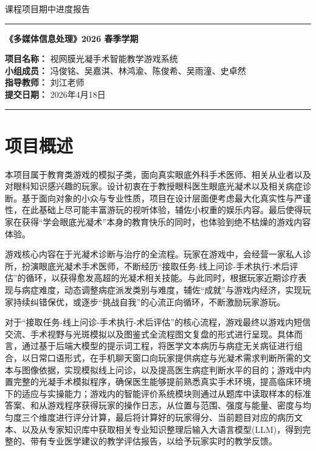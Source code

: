 \documentclass[12pt,a4paper]{ctexart}
\newcommand{\templaterule}{
  \noindent\color{linegray}\rule{\textwidth}{0.5pt}\color{black}
}
\begin{document}
{ 课程项目期中进度报告\par}

\vspace{1em}
\templaterule
\vspace{1.5em}

{\bfseries 《多媒体信息处理》2026 春季学期\par}
\vspace{1em}

\begin{tcolorbox}[
  enhanced,
  breakable,
  colback=white,
  colframe=white,
  boxrule=0pt,
  left=1em,
  right=0pt,
  top=0.5em,
  bottom=0.5em,
  borderline west={1.2pt}{0pt}{linegray}
]
\noindent
\textbf{项目名称：} 视网膜光凝手术智能教学游戏系统\\
\textbf{小组成员：} 冯俊铭、吴嘉淇、林鸿渝、陈俊希、吴雨潼、史卓然\\
\textbf{指导教师：} 刘江老师\\
\textbf{提交日期：} 2026年4月18日

\end{tcolorbox}

\templaterule

\section{项目概述}
本项目属于教育类游戏的模拟子类，面向真实眼底外科手术医师、相关从业者以及对眼科知识感兴趣的玩家。设计初衷在于教授眼科医生眼底光凝术以及相关病症诊断。基于面向对象的小众与专业性质，项目在设计层面便考虑最大化真实性与严谨性，在此基础上尽可能丰富游玩的视听体验，辅佐小权重的娱乐内容。最后使得玩家在获得“学会眼底光凝术”本身的教育快乐的同时，也体验到绝不枯燥的游戏内容体验。

游戏核心内容在于光凝术诊断与治疗的全流程。玩家在游戏中，会经营一家私人诊所，扮演眼底光凝术手术医师，不断经历“接取任务-线上问诊-手术执行-术后评估”的循环，以获得愈发高超的光凝术相关技能。与此同时，根据玩家近期诊疗表现与病症难度，动态调整病症派发类别与难度，辅佐“成就”与游戏内经济，实现玩家持续纠错保优，或逐步“挑战自我”的心流正向循环，不断激励玩家游玩。

对于“接取任务-线上问诊-手术执行-术后评估”的核心流程，游戏最终以游戏内短信交流、手术视野与光斑模拟以及图鉴式全流程图文复盘的形式进行呈现。具体而言，通过基于后端大模型的提示词工程，将医学文本病历与病症无关病征进行组合，以日常口语形式，在手机聊天窗口向玩家提供病症与光凝术需求判断所需的文本与图像依据，实现模拟线上问诊，以及提高医生病症判断水平的目的；游戏中内置完整的光凝手术模拟程序，确保医生能够提前熟悉真实手术环境，提高临床环境下的适应与实操能力；游戏内的智能评价系统模块则通过从题库中读取样本的标准答案、和从游戏程序获得玩家的操作日志，从位置与范围、强度与能量、密度与均匀度三个维度进行评分计算，最后将计算好的玩家得分、当前题目对应的病历文本、以及从专家知识库中获取相关专业知识整理后输入大语言模型(LLM)，得到完整的、带有专业医学建议的教学评估报告，以给予玩家实时的教学反馈。
\end{document}

